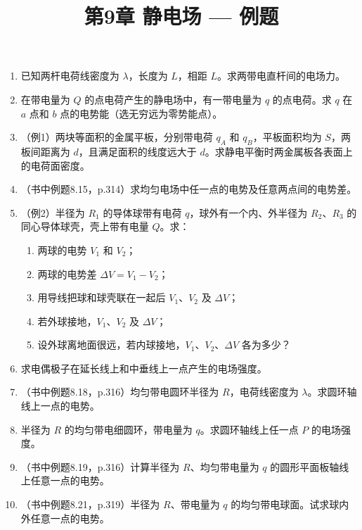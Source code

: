\documentclass{ctexart}
\title{\textbf{第9章 静电场} --- 例题}
\author{}
\date{}
\begin{document}
\maketitle

\begin{enumerate}

\item 已知两杆电荷线密度为 $\lambda$，长度为 $L$，相距 $L$。求两带电直杆间的电场力。

\item 在带电量为 $Q$ 的点电荷产生的静电场中，有一带电量为 $q$ 的点电荷。求 $q$ 在 $a$ 点和 $b$ 点的电势能（选无穷远为零势能点）。

\item（例1）两块等面积的金属平板，分别带电荷 $q_A$ 和 $q_B$，平板面积均为 $S$，两板间距离为 $d$，且满足面积的线度远大于 $d$。求静电平衡时两金属板各表面上的电荷面密度。

\item（书中例题8.15，p.314）求均匀电场中任一点的电势及任意两点间的电势差。

\item（例2）半径为 $R_1$ 的导体球带有电荷 $q$，球外有一个内、外半径为 $R_2$、$R_3$ 的同心导体球壳，壳上带有电量 $Q$。求：
\begin{enumerate}
  \item 两球的电势 $V_1$ 和 $V_2$；
  \item 两球的电势差 $\Delta V = V_1 - V_2$；
  \item 用导线把球和球壳联在一起后 $V_1$、$V_2$ 及 $\Delta V$；
  \item 若外球接地，$V_1$、$V_2$ 及 $\Delta V$；
  \item 设外球离地面很远，若内球接地，$V_1$、$V_2$、$\Delta V$ 各为多少？
\end{enumerate}

\item 求电偶极子在延长线上和中垂线上一点产生的电场强度。

\item（书中例题8.18，p.316）均匀带电圆环半径为 $R$，电荷线密度为 $\lambda$。求圆环轴线上一点的电势。

\item 半径为 $R$ 的均匀带电细圆环，带电量为 $q$。求圆环轴线上任一点 $P$ 的电场强度。

\item（书中例题8.19，p.316）计算半径为 $R$、均匀带电量为 $q$ 的圆形平面板轴线上任意一点的电势。

\item（书中例题8.21，p.319）半径为 $R$、带电量为 $q$ 的均匀带电球面。试求球内外任意一点的电势。


\end{enumerate}
\end{document}
